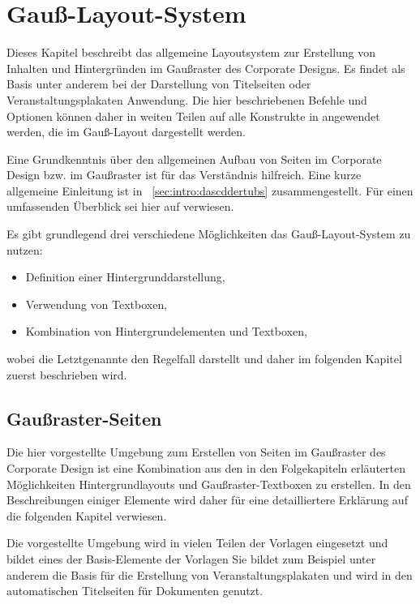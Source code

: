 \chapter{Gauß-Layout-System}\label{sec:gausslayout}

Dieses Kapitel beschreibt das allgemeine Layoutsystem zur Erstellung von
Inhalten und Hintergründen im Gaußraster des Corporate Designs.
Es findet als Basis unter anderem bei der Darstellung von Titelseiten oder
Veranstaltungsplakaten Anwendung. Die hier beschriebenen Befehle und Optionen
können daher in weiten Teilen auf alle Konstrukte in \tubslatex angewendet
werden, die im Gauß-Layout dargestellt werden.

Eine Grundkenntnis über den allgemeinen Aufbau von Seiten im Corporate
Design bzw. im Gaußraster ist für das Verständnis hilfreich.
Eine kurze allgemeine Einleitung ist in \chaptername~\ref{sec:intro:dascddertubs}
zusammengestellt. Für einen umfassenden Überblick sei hier auf \cite{toolbox}
verwiesen.

Es gibt grundlegend drei verschiedene Möglichkeiten das Gauß-Layout-System
zu nutzen:
\begin{itemize}
  \item Definition einer Hintergrunddarstellung,
  \item Verwendung von Textboxen,
  \item Kombination von Hintergrundelementen und Textboxen,
\end{itemize}
wobei die Letztgenannte den Regelfall darstellt und daher im folgenden Kapitel
zuerst beschrieben wird.



\clearpage
\section{Gaußraster-Seiten}\label{sec:gausslayout:gausspage}

Die hier vorgestellte Umgebung zum Erstellen von Seiten im Gaußraster des
Corporate Design ist eine Kombination aus den in den Folgekapiteln
erläuterten Möglichkeiten Hintergrundlayouts und Gaußraster-Textboxen 
zu erstellen. In den Beschreibungen einiger Elemente wird daher für eine
detailliertere Erklärung auf die folgenden Kapitel verwiesen.

Die vorgestellte Umgebung wird in vielen Teilen der Vorlagen eingesetzt
und bildet eines der Basis-Elemente der Vorlagen
Sie bildet zum Beispiel unter anderem die Basis für die Erstellung von
Veranstaltungsplakaten und wird in den automatischen Titelseiten für Dokumenten
genutzt.

